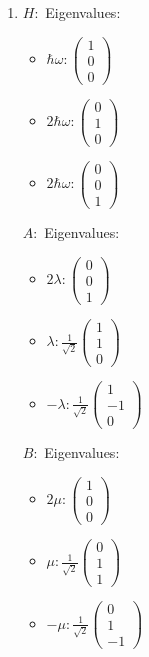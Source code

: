 \begin{enumerate}
    \item 
    $H:$
    Eigenvalues: 
    \begin{itemize}
        \item $
    \hbar\omega: 
    \begin{pmatrix}
    1\\0\\0
    \end{pmatrix}
    $
     \item $
    2\hbar\omega: 
    \begin{pmatrix}
    0\\1\\0
    \end{pmatrix}
    $
     \item $
    2\hbar\omega: 
    \begin{pmatrix}
    0\\0\\1
    \end{pmatrix}
    $
    \end{itemize}

     $A:$
    Eigenvalues: 
    \begin{itemize}
        \item $
    2\lambda: 
    \begin{pmatrix}
    0\\0\\1
    \end{pmatrix}
    $
     \item $
    \lambda:
    \frac{1}{\sqrt{2}}
    \begin{pmatrix}
    1\\1\\0
    \end{pmatrix}
    $
     \item $
    -\lambda: 
    \frac{1}{\sqrt{2}}
    \begin{pmatrix}
    1\\-1\\0
    \end{pmatrix}
    $
    
    \end{itemize}
    $B:$
    Eigenvalues: 
    \begin{itemize}
        \item $
    2\mu: 
    \begin{pmatrix}
    1\\0\\0
    \end{pmatrix}
    $
     \item $
    \mu: 
    \frac{1}{\sqrt{2}}
    \begin{pmatrix}
    0\\1\\1
    \end{pmatrix}
    $
     \item $
    -\mu: 
    \frac{1}{\sqrt{2}}
    \begin{pmatrix}
    0\\1\\-1
    \end{pmatrix}
    $
    

\end{itemize}
\end{enumerate}
